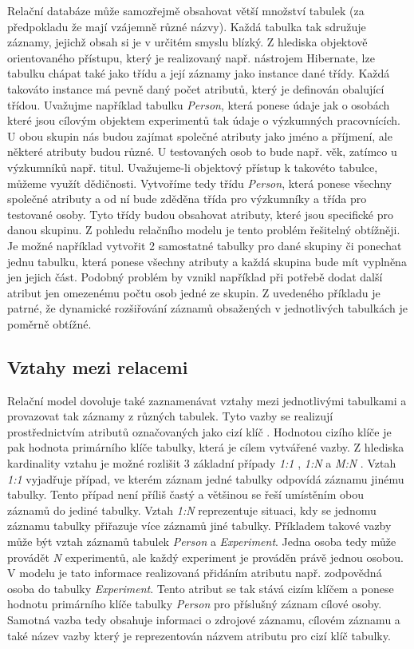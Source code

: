 \documentclass{projekt}
\begin{document}
\hspace{0.65cm}Relační databáze může samozřejmě obsahovat větší množství tabulek (za předpokladu že mají vzájemně různé názvy). Každá tabulka tak sdružuje záznamy, jejichž obsah si je v určitém smyslu blízký. Z hlediska objektově orientovaného přístupu, který je realizovaný např. nástrojem Hibernate, lze tabulku chápat také jako třídu a její záznamy jako instance dané třídy. Každá takováto instance má pevně daný počet atributů, který je definován obalující třídou. Uvažujme například tabulku {\it Person}, která ponese údaje jak o osobách které jsou cílovým objektem experimentů tak údaje o výzkumných pracovnících. U obou skupin nás budou zajímat společné atributy jako jméno a příjmení, ale některé atributy budou různé. U testovaných osob to bude např. věk, zatímco u výzkumníků např. titul. Uvažujeme-li objektový přístup k takovéto tabulce, můžeme využít dědičnosti. Vytvoříme tedy třídu {\it Person}, která ponese všechny společné atributy a od ní bude zděděna třída pro výzkumníky a třída pro testované osoby. Tyto třídy budou obsahovat atributy, které jsou specifické pro danou skupinu. Z pohledu relačního modelu je tento problém řešitelný obtížněji. Je možné například vytvořit 2 samostatné tabulky pro dané skupiny či ponechat jednu tabulku, která ponese všechny atributy a každá skupina bude mít vyplněna jen jejich část. Podobný problém by vznikl například při potřebě dodat další atribut jen omezenému počtu osob jedné ze skupin. Z uvedeného příkladu je patrné, že dynamické rozšiřování záznamů obsažených v jednotlivých tabulkách je poměrně obtížné.

\subsection{Vztahy mezi relacemi}

\hspace{0.65cm}Relační model dovoluje také zaznamenávat vztahy mezi jednotlivými tabulkami a provazovat tak záznamy z různých tabulek. Tyto vazby se realizují prostřednictvím atributů označovaných jako cizí klíč \cite{_20}. Hodnotou cizího klíče je pak hodnota primárního klíče tabulky, která je cílem vytvářené vazby. Z hlediska kardinality vztahu je možné rozlišit 3 základní případy {\it 1:1} , {\it 1:N} a {\it M:N} \cite{_22}. Vztah {\it 1:1} vyjadřuje případ, ve kterém záznam jedné tabulky odpovídá záznamu jinému tabulky. Tento případ není příliš častý a většinou se řeší umístěním obou záznamů do jediné tabulky. Vztah {\it 1:N} reprezentuje situaci, kdy se jednomu záznamu tabulky přiřazuje více záznamů jiné tabulky. Příkladem takové vazby může být vztah záznamů tabulek {\it Person} a {\it Experiment}. Jedna osoba tedy může provádět {\it N} experimentů, ale každý experiment je prováděn právě jednou osobou. V modelu je tato informace realizovaná přidáním atributu např. zodpovědná osoba do tabulky {\it Experiment}. Tento atribut se tak stává cizím klíčem a ponese hodnotu primárního klíče tabulky {\it Person} pro příslušný záznam cílové osoby. Samotná vazba tedy obsahuje informaci o zdrojové záznamu, cílovém záznamu a také název vazby který je reprezentován názvem atributu pro cizí klíč tabulky.
\end{document}
